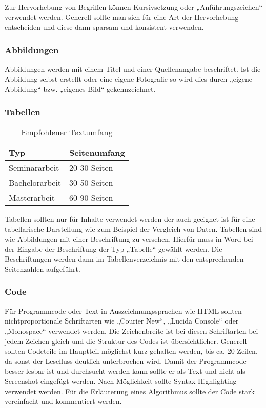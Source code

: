 Zur Hervorhebung von Begriffen können Kursivsetzung oder „Anführungszeichen“ verwendet werden. Generell sollte man sich für eine Art der Hervorhebung entscheiden und diese dann sparsam und  konsistent verwenden. 

\subsubsection{Abbildungen}\label{subsubsec:abbildungen}

Abbildungen werden mit einem Titel und einer Quellenangabe beschriftet. Ist die Abbildung selbst erstellt oder eine eigene Fotografie so wird dies durch „eigene Abbildung“ bzw. „eigenes Bild“ gekennzeichnet. 


\subsubsection{Tabellen}\label{subsubsec:tabellen}

\begin{table}[h!]
\centering
\begin{tabular}{ l|l } 
\hline
    \textbf{Typ} & \textbf{Seitenumfang} \\
\hline
Seminararbeit & 20-30 Seiten \\
Bachelorarbeit & 30-50 Seiten \\
Masterarbeit & 60-90 Seiten \\
\hline
\end{tabular}
\caption{Empfohlener Textumfang}
\label{table:textumfang}
\end{table}

Tabellen sollten nur für Inhalte verwendet werden der auch geeignet ist für eine tabellarische Darstellung wie zum Beispiel der Vergleich von Daten. Tabellen sind wie Abbildungen mit einer Beschriftung zu versehen. Hierfür muss in Word bei der Eingabe der Beschriftung der Typ „Tabelle“ gewählt werden. Die Beschriftungen werden dann im Tabellenverzeichnis mit den entsprechenden Seitenzahlen aufgeführt.

\subsubsection{Code}\label{subsubsec:code}

Für Programmcode oder Text in Auszeichnungssprachen wie HTML sollten nichtproportionale Schriftarten wie „Courier New“, „Lucida Console“ oder „Monospace“ verwendet werden. Die Zeichenbreite ist bei diesen Schriftarten bei jedem Zeichen gleich und die Struktur des Codes ist übersichtlicher. Generell sollten Codeteile im Hauptteil möglichst kurz gehalten werden, bis ca. 20 Zeilen, da sonst der Lesefluss deutlich unterbrochen wird.  Damit der Programmcode besser lesbar ist und durchsucht werden kann sollte er als Text und nicht als Screenshot eingefügt werden. Nach Möglichkeit sollte Syntax-Highlighting verwendet werden. Für die  Erläuterung eines Algorithmus sollte der Code stark vereinfacht und kommentiert werden.


